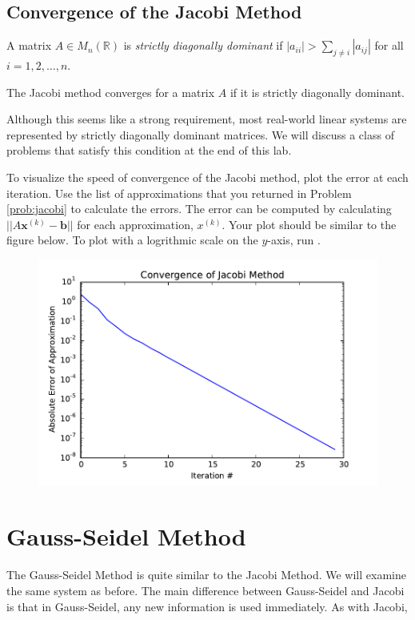 \subsection*{Convergence of the Jacobi Method}
\begin{definition}
    A matrix $A \in M_n(\mathbb{R})$ is \emph{strictly diagonally dominant} if
    $|a_{ii}| > \sum_{j \neq i} |a_{ij}|$ for all $i = 1,2,\hdots,n$.
\end{definition}

\begin{theorem}
The Jacobi method converges for a matrix $A$ if it is strictly diagonally
dominant.
\end{theorem}

Although this seems like a strong requirement, most real-world linear systems
are represented by strictly diagonally dominant matrices.
We will discuss a class of problems that satisfy this condition at the end of
this lab.

\begin{problem}
To visualize the speed of convergence of the Jacobi method, plot the error at each
iteration. Use the list of approximations that you returned in Problem \ref{prob:jacobi}
to calculate the errors. The error can be computed by calculating
$||A\mathbf{x}^{(k)} - \mathbf{b}||$
for each approximation, $x^{(k)}$. Your plot should be similar to the figure below.
To plot with a logrithmic scale on the $y$-axis, run .

\begin{figure}[H] \label{fig:jacobi_convergence}
\includegraphics[width=.7\textwidth]{jacobi_convergence.pdf}
\label{fig:jacobi_convergence}
\end{figure}
\end{problem}

\section*{Gauss-Seidel Method}
The Gauss-Seidel Method is quite similar to the Jacobi Method. We will examine
the same system as before. The main difference between Gauss-Seidel and Jacobi
is that in Gauss-Seidel, any new information is used immediately. As with Jacobi,

